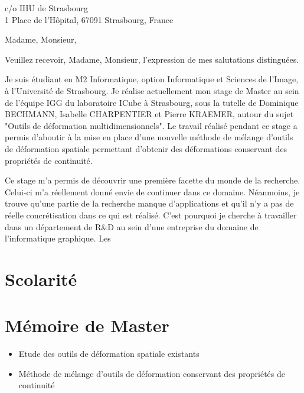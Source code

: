 \documentclass[11pt,a4paper,sans]{moderncv}
\begin{document}
{c/o IHU de Strasbourg \\
1 Place de l'Hôpital,
67091 Strasbourg, France}
\date{\mydateformat\today}
\opening{Madame, Monsieur,}
\closing{Veuillez recevoir, Madame, Monsieur, l'expression de mes salutations
distinguées.}
\makelettertitle

Je suis étudiant en M2 Informatique, option Informatique et Sciences de
l'Image, à l'Université de Strasbourg. Je réalise actuellement mon stage de
Master au sein de l'équipe IGG du laboratoire ICube à Strasbourg, sous la
tutelle de Dominique BECHMANN, Isabelle CHARPENTIER et Pierre KRAEMER, autour
du sujet "Outils de déformation multidimensionnels". Le travail réalisé
pendant ce stage a permis d'aboutir à la mise en place d'une nouvelle méthode
de mélange d'outils de déformation spatiale permettant d'obtenir des
déformations conservant des propriétés de continuité.

Ce stage m'a permis de découvrir une première facette du monde de la
recherche. Celui-ci m'a réellement donné envie de continuer dans ce domaine.
Néanmoins, je trouve qu'une partie de la recherche manque d'applications et
qu'il n'y a pas de réelle concrétisation dans ce qui est réalisé. C'est
pourquoi je cherche à travailler dans un département de R&D au sein d'une
entreprise du domaine de l'informatique graphique. Les 

\makeletterclosing

\clearpage

\makecvtitle

\section{Scolarité}

\section{Mémoire de Master}
\begin{itemize}
\item Etude des outils de déformation spatiale existants
\item Méthode de mélange d'outils de déformation conservant des propriétés de
continuité
\end{itemize}
\end{document}
